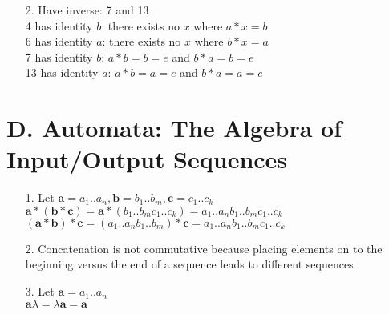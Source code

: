 \begin{enumerate}
\item[2.]
Have inverse: 7 and 13 \\
4 has identity $b$: there exists no $x$ where $a*x=b$\\
6 has identity $a$: there exists no $x$ where $b*x=a$\\
7 has identity $b$: $a*b=b=e$ and $b*a=b=e$\\
13 has identity $a$: $a*b=a=e$ and $b*a=a=e$\\

\end{enumerate}

\section*{D. Automata: The Algebra of Input/Output Sequences}

\begin{enumerate}

\item[1.]
Let $\boldsymbol{a}=a_{1}..a_{n}, \boldsymbol{b}=b_{1}..b_{m}, \boldsymbol{c}=c_{1}..c_{k}$ \\
$\boldsymbol{a}*(\boldsymbol{b}*\boldsymbol{c})=\boldsymbol{a}*(b_{1}..b_{m}c_{1}..c_{k})=a_{1}..a_{n}b_{1}..b_{m}c_{1}..c_{k}$ \\
$(\boldsymbol{a}*\boldsymbol{b})*\boldsymbol{c}=(a_{1}..a_{n}b_{1}..b_{m})*\boldsymbol{c}=a_{1}..a_{n}b_{1}..b_{m}c_{1}..c_{k}$

\item[2.]
Concatenation is not commutative because placing elements on to the beginning 
versus the end of a sequence leads to different sequences.

\item[3.]
Let $\boldsymbol{a}=a_{1}..a_{n}$ \\
$\boldsymbol{a} \lambda=\lambda \boldsymbol{a} = \boldsymbol{a}$ \\


\end{enumerate}